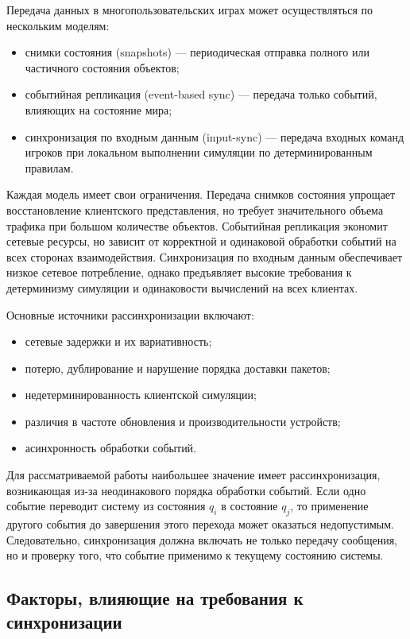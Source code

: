 Передача данных в многопользовательских играх может осуществляться по нескольким моделям:
\begin{itemize}
	\item снимки состояния (snapshots) --- периодическая отправка полного или частичного состояния объектов;
	\item событийная репликация (event-based sync) --- передача только событий, влияющих на состояние мира;
	\item синхронизация по входным данным (input-sync) --- передача входных команд игроков при локальном выполнении симуляции по детерминированным правилам.
\end{itemize}

Каждая модель имеет свои ограничения. Передача снимков состояния упрощает восстановление клиентского представления, но требует значительного объема трафика при большом количестве объектов. Событийная репликация экономит сетевые ресурсы, но зависит от корректной и одинаковой обработки событий на всех сторонах взаимодействия. Синхронизация по входным данным обеспечивает низкое сетевое потребление, однако предъявляет высокие требования к детерминизму симуляции и одинаковости вычислений на всех клиентах.

Основные источники рассинхронизации включают:
\begin{itemize}
	\item сетевые задержки и их вариативность;
	\item потерю, дублирование и нарушение порядка доставки пакетов;
	\item недетерминированность клиентской симуляции;
	\item различия в частоте обновления и производительности устройств;
	\item асинхронность обработки событий.
\end{itemize}

Для рассматриваемой работы наибольшее значение имеет рассинхронизация, возникающая из-за неодинакового порядка обработки событий. Если одно событие переводит систему из состояния $q_i$ в состояние $q_j$, то применение другого события до завершения этого перехода может оказаться недопустимым. Следовательно, синхронизация должна включать не только передачу сообщения, но и проверку того, что событие применимо к текущему состоянию системы.

\subsection{Факторы, влияющие на требования к синхронизации}

